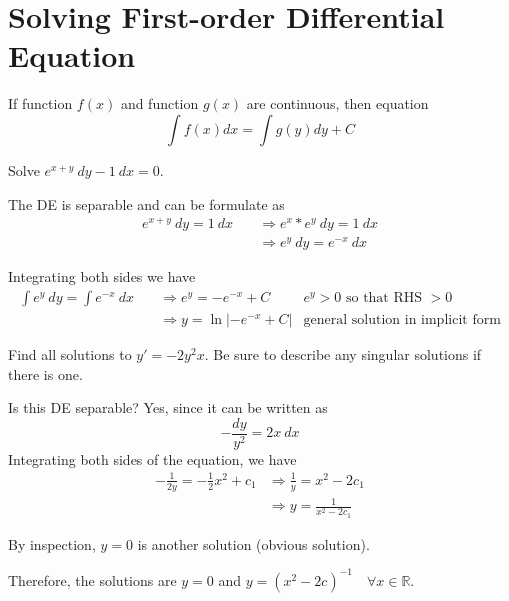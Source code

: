 \chapter{Solving First-order Differential Equation}

\begin{theorem}
    If function $f(x)$ and function $g(x)$ are continuous, then equation 
    \[
        \int f(x) dx = \int g(y) dy + C
    \]
\end{theorem}

\begin{example}
    Solve $e^{x+y}\> dy - 1\> dx = 0$.
\end{example}
\begin{solution}
    The DE is separable and can be formulate as 
    \begin{align*}
        e^{x+y}\> dy = 1\> dx \quad &\Rightarrow e^x * e^y \> dy = 1\> dx\\
        &\Rightarrow e^y \> dy = e^{-x}\> dx
    \end{align*}
    
    Integrating both sides we have
    \begin{align*}
        \int e^y \> dy = \int e^{-x}\> dx \quad &\Rightarrow e^y = -e^{-x} + C & 
        e^y > 0 \text{ so that RHS }> 0 \\
        &\Rightarrow y = \ln |-e^{-x} + C| &\text{general solution in implicit form}
    \end{align*}
\end{solution}

\begin{example}
    Find all solutions to $y' = -2y^2x$. Be sure to describe any singular solutions if there is one.
\end{example}
\begin{solution}
    Is this DE separable? Yes, since it can be written as 
    \[
        - \frac{dy}{y^2} = 2x\> dx
    \]
    Integrating both sides of the equation, we have 
    \begin{align*}
        -\frac{1}{2y} = -\frac{1}{2}x^2 + c_1 &\Rightarrow \frac{1}{y} = x^2 - 2c_1\\
        &\Rightarrow y = \frac{1}{x^2 - 2c_1}
    \end{align*}

    By inspection, $y = 0$ is another solution (obvious solution).

    Therefore, the solutions are $y = 0$ and $y = (x^2 - 2c)^{-1} \quad \forall x \in \mathbb{R}$.
\end{solution}


